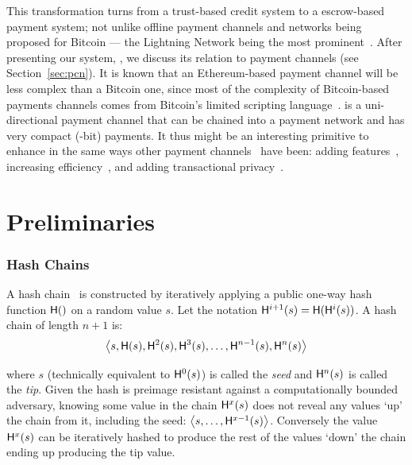 This transformation turns \pw from a trust-based credit system to a escrow-based payment system; not unlike offline payment channels and networks being proposed for Bitcoin --- the Lightning Network being the most prominent~\cite{PD15}. After presenting our system, \ew, we discuss its relation to payment channels (see Section~\ref{sec:pcn}). It is known that an Ethereum-based payment channel will be less complex than a Bitcoin one, since most of the complexity of Bitcoin-based payments channels comes from Bitcoin's limited scripting language~\cite{MMSH16}. \ew is a uni-directional payment channel that can be chained into a payment network and has very compact (-bit) payments. It thus might be an interesting primitive to enhance in the same ways other payment channels~\cite{DW15,PD15} have been: adding features~\cite{KG17}, increasing efficiency~\cite{DEFM17,MBKM17}, and adding transactional privacy~\cite{GM17,MMK+17,HAB+17,RMKG18}.


\section{Preliminaries}

\subsubsection{Hash Chains}

A hash chain~\cite{Lam81} is constructed by iteratively applying a public one-way hash function $\mathsf{H}()$ on a random value $s$. Let the notation $\mathsf{H}^{i+1}(s) = \mathsf{H}(\mathsf{H}^{i}(s))$. A hash chain of length $n+1$ is:
\begin{equation*} \left \langle s,\mathsf{H}(s),\mathsf{H}^{2}(s),\mathsf{H}^{3}(s),\ldots,\mathsf{H}^{n-1}(s),\mathsf{H}^{n}(s) \right \rangle \end{equation*}

where $s$ (technically equivalent to $\mathsf{H}^{0}(s)$) is called the \textit{seed} and $\mathsf{H}^{n}(s)$ is called the \textit{tip}. Given the hash is preimage resistant against a computationally bounded adversary, knowing some value in the chain $\mathsf{H}^{x}(s)$ does not reveal any values `up' the chain from it, including the seed: $\left \langle s,\ldots,\mathsf{H}^{x-1}(s) \right \rangle$. Conversely the value $\mathsf{H}^{x}(s)$ can be iteratively hashed to produce the rest of the values `down' the chain ending up producing the tip value. 

